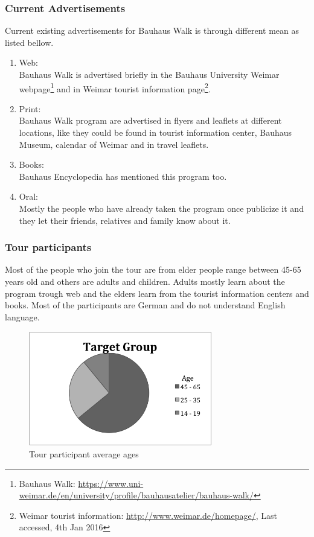 \subsubsection{Current Advertisements}
Current existing advertisements for Bauhaus Walk is through different mean as listed bellow.

\begin {enumerate}

\item	Web: \\
Bauhaus Walk is advertised briefly in the Bauhaus University Weimar webpage\footnote{Bauhaus Walk: \url{ https://www.uni-weimar.de/en/university/profile/bauhausatelier/bauhaus-walk/}} and in Weimar tourist information page\footnote{Weimar tourist information: \url{http://www.weimar.de/homepage/}, Last accessed, 4th Jan 2016}.

\item	Print: \\
Bauhaus Walk program are advertised in flyers and leaflets at different locations, like they could be found in tourist information center, Bauhaus Museum, calendar of Weimar and in travel leaflets. 

\item	Books: \\
Bauhaus Encyclopedia has mentioned this program too. 

\item	Oral: \\
Mostly the people who have already taken the program once publicize it and they let their friends, relatives and family know about it.
\end{enumerate}


\subsubsection{Tour participants}
Most of the people who join the tour are from elder people range between 45-65 years old and others are adults and children. Adults mostly learn about the program trough web and the elders learn from the tourist information centers and books.  Most of the participants are German and do not understand English language.

\begin{figure}[H]
    \centering
    \includegraphics[width=8cm, height=5cm]{Figures/4/target_group}%
    \caption{Tour participant average ages}%
    \label{fig:target_group}%
\end{figure}


